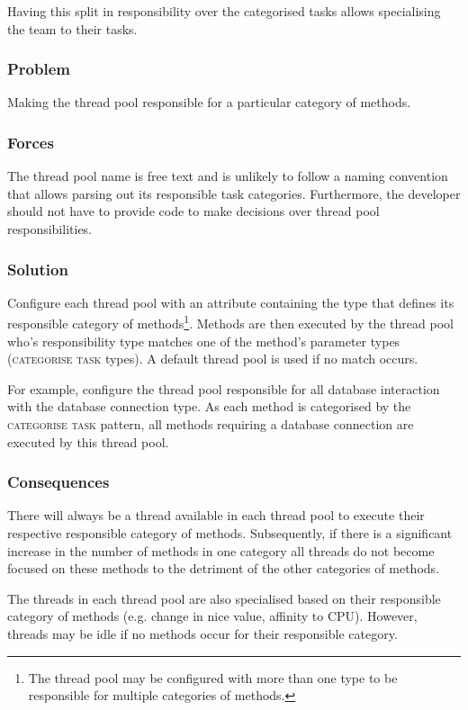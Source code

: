 \documentclass[prodmode]{style/acmlarge}
\begin{document}
Having this split in responsibility over the categorised tasks allows
specialising the team to their tasks.

\subsubsection*{Problem} Making the thread pool responsible for a particular
category of methods.

\subsubsection*{Forces} The thread pool name is free text and is unlikely to
follow a naming convention that allows parsing out its responsible task
categories.  Furthermore, the developer should not have to provide code to make
decisions over thread pool responsibilities.

\subsubsection*{Solution} Configure each thread pool with an attribute
containing the type that defines its responsible category of
methods\footnote{The thread pool may be configured with more than one type to be
responsible for multiple categories of methods.}. Methods are then executed by
the thread pool who's responsibility type matches one of the method's parameter
types (\textsc{categorise task} types).  A default thread pool is used if no
match occurs.

For example, configure the thread pool responsible for all database interaction
with the database connection type.  As each method is categorised by the
\textsc{categorise task} pattern, all methods requiring a database connection
are executed by this thread pool.

\subsubsection*{Consequences} There will always be a thread available in each
thread pool to execute their respective responsible category of methods. 
Subsequently, if there is a significant increase in the number of methods in one
category all threads do not become focused on these methods to the detriment of
the other categories of methods.

The threads in each thread pool are also specialised based on their responsible
category of methods (e.g. change in nice value, affinity to CPU).  However,
threads may be idle if no methods occur for their responsible category.
\end{document}
